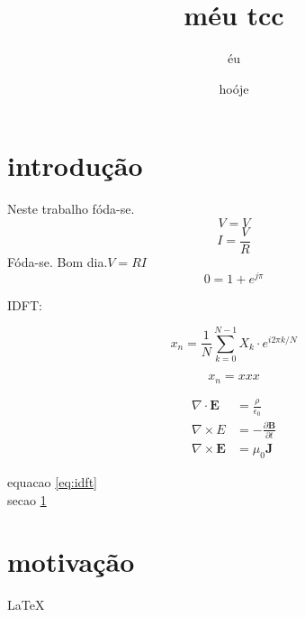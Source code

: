 \documentclass{article}
\author{éu}
\date{hoóje}
\title{méu tcc}
\newcommand{\Evet}[1]{\textbf{#1}}
\begin{document}
\maketitle

\newpage

\section{introdução}
\label{sec:intro}
\Huge
Neste trabalho fóda-se.$$V =V$$ $$I=\frac{V}{R}$$
Fóda-se.
Bom dia.$V=R I$ $$0=1+e^{j\pi} $$

IDFT:

$$x_n= \frac{1}{N} \sum_{k=0}^{N-1} X_k \cdot e^{i2 \pi k / N}$$

\begin{equation}
\label{eq:idft}
x_n=xxx
\end{equation}

\begin{align}
\nabla \cdot \Evet{E} & =\frac{\rho}{\epsilon_0} \\
\nabla \times E & =  - \frac{\partial \textbf{B}}{\partial t} \\
\nabla \times \Evet{E} & = \mu_0 \Evet{J}
\end{align}

equacao \ref{eq:idft} \\
secao \ref{sec:intro}
\section{\Huge motivação}
\LaTeX
\end{document}
